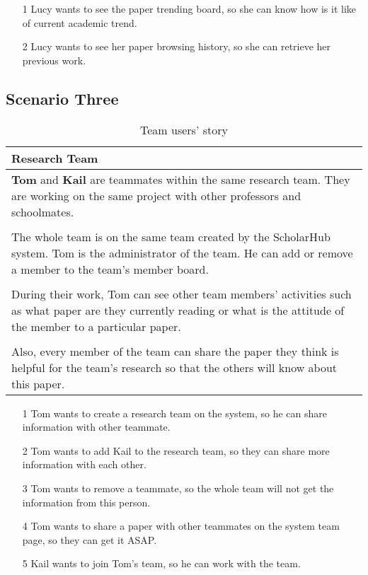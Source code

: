 \begin{itemize}
	\item [1] Lucy wants to see the paper trending board, so she can know how is it like of current academic trend.
	\item [2] Lucy wants to see her paper browsing history, so she can retrieve her previous work.
\end{itemize}

\subsection*{Scenario Three}

\begin{table}[!ht]
	\renewcommand{\arraystretch}{1.2}
	\centering
	\begin{tabular}{ p{14cm} }
		\hline
		\textbf{Research Team}                                                               \\
		\hline
		\textbf{Tom} and \textbf{Kail} are teammates within the same research team. They are
		working on the same project with other professors and schoolmates.                   \\
		\\
		The whole team is on the same team created by the ScholarHub system. Tom is the
		administrator of the team. He can add or remove a member to the team's member board. \\
		\\
		During their work, Tom can see other team members' activities such as what paper are
		they currently reading or what is the attitude of the member to a particular paper.  \\
		\\
		Also, every member of the team can share the paper they think is helpful for the team's
		research so that the others will know about this paper.                              \\
		\hline
	\end{tabular}
	\caption{Team users' story}
	\label{table:us3}
\end{table}

\begin{itemize}
	\item [1] Tom wants to create a research team on the system, so he can share information with other teammate.
	\item [2] Tom wants to add Kail to the research team, so they can share more information with each other.
	\item [3] Tom wants to remove a teammate, so the whole team will not get the information from this person.
	\item [4] Tom wants to share a paper with other teammates on the system team page, so they can get it ASAP.
	\item [5] Kail wants to join Tom's team, so he can work with the team.
\end{itemize}
